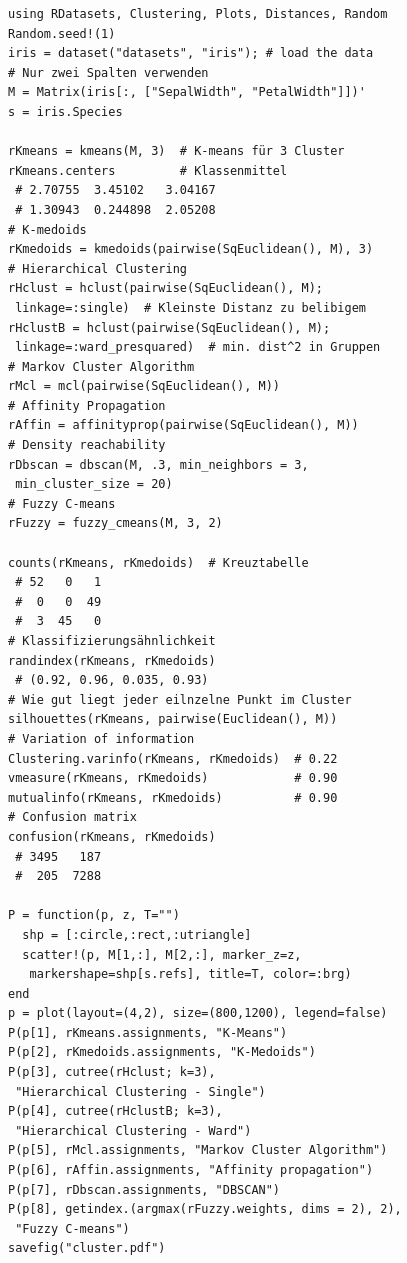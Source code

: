 \documentclass[10pt,twocolumn]{scrartcl}
\begin{document}
\begin{lstlisting}
using RDatasets, Clustering, Plots, Distances, Random
Random.seed!(1)
iris = dataset("datasets", "iris"); # load the data
# Nur zwei Spalten verwenden
M = Matrix(iris[:, ["SepalWidth", "PetalWidth"]])'
s = iris.Species

rKmeans = kmeans(M, 3)  # K-means für 3 Cluster
rKmeans.centers         # Klassenmittel
 # 2.70755  3.45102   3.04167
 # 1.30943  0.244898  2.05208
# K-medoids
rKmedoids = kmedoids(pairwise(SqEuclidean(), M), 3)
# Hierarchical Clustering
rHclust = hclust(pairwise(SqEuclidean(), M);
 linkage=:single)  # Kleinste Distanz zu belibigem
rHclustB = hclust(pairwise(SqEuclidean(), M);
 linkage=:ward_presquared)  # min. dist^2 in Gruppen
# Markov Cluster Algorithm
rMcl = mcl(pairwise(SqEuclidean(), M))
# Affinity Propagation
rAffin = affinityprop(pairwise(SqEuclidean(), M))
# Density reachability
rDbscan = dbscan(M, .3, min_neighbors = 3,
 min_cluster_size = 20)
# Fuzzy C-means
rFuzzy = fuzzy_cmeans(M, 3, 2)

counts(rKmeans, rKmedoids)  # Kreuztabelle
 # 52   0   1
 #  0   0  49
 #  3  45   0
# Klassifizierungsähnlichkeit
randindex(rKmeans, rKmedoids)
 # (0.92, 0.96, 0.035, 0.93)
# Wie gut liegt jeder eilnzelne Punkt im Cluster
silhouettes(rKmeans, pairwise(Euclidean(), M))
# Variation of information
Clustering.varinfo(rKmeans, rKmedoids)  # 0.22
vmeasure(rKmeans, rKmedoids)            # 0.90
mutualinfo(rKmeans, rKmedoids)          # 0.90
# Confusion matrix
confusion(rKmeans, rKmedoids)
 # 3495   187
 #  205  7288

P = function(p, z, T="")
  shp = [:circle,:rect,:utriangle]
  scatter!(p, M[1,:], M[2,:], marker_z=z,
   markershape=shp[s.refs], title=T, color=:brg)
end
p = plot(layout=(4,2), size=(800,1200), legend=false)
P(p[1], rKmeans.assignments, "K-Means")
P(p[2], rKmedoids.assignments, "K-Medoids")
P(p[3], cutree(rHclust; k=3),
 "Hierarchical Clustering - Single")
P(p[4], cutree(rHclustB; k=3),
 "Hierarchical Clustering - Ward")
P(p[5], rMcl.assignments, "Markov Cluster Algorithm")
P(p[6], rAffin.assignments, "Affinity propagation")
P(p[7], rDbscan.assignments, "DBSCAN")
P(p[8], getindex.(argmax(rFuzzy.weights, dims = 2), 2),
 "Fuzzy C-means")
savefig("cluster.pdf")
\end{lstlisting}
\end{document}

